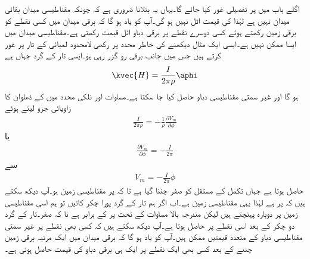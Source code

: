 اگلے باب میں  پر تفصیلی غور کیا جائے گا۔یہاں یہ بتلانا ضروری ہے کہ چونکہ مقناطیسی میدان  بقائی میدان نہیں ہے لہٰذا  کی قیمت اٹل نہیں ہو گی۔آپ کو یاد ہو گا کہ برقی میدان میں کسی نقطے کو برقی زمین رکھتے ہوئے کسی دوسرے نقطے پر برقی دباو اٹل قیمت رکھتی ہے۔مقناطیسی میدان میں ایسا ممکن نہیں ہے۔ایسی ایک مثال دیکھنے کی خاطر  محدد پر رکھی لامحدود لمبائی کے تار پر غور کرتے ہیں جس میں  جانب  برقی رو گزر رہی ہو۔ایسی تار کے گرد جہاں  ہے
\begin{align*}
\kvec{H}=\frac{I}{2\pi \rho} \aphi
\end{align*}
ہو گا اور غیر سمتی مقناطیسی دباو حاصل کیا جا سکتا ہے۔مساوات  اور نلکی محدد میں  کے ڈھلوان کا زاویائی جزو لیتے ہوئے
\begin{align*}
\frac{I}{2\pi \rho} =-\frac{1}{\rho} \frac{\partial V_m}{\partial \phi}
\end{align*}
یا
\begin{align*}
\frac{\partial V_m}{\partial \phi}=-\frac{I}{2\pi}
\end{align*}
سے
\begin{align*}
V_m=-\frac{I}{2\pi}\phi
\end{align*}
حاصل ہوتا ہے جہاں تکمل کے مستقل کو صفر چننا گیا ہے تا کہ  پر مقناطیسی زمین ہو۔آپ دیکھ سکتے ہیں کہ  پر  ہے لہٰذا یہی مقناطیسی زمین ہے۔اب اگر ہم تار کے گرد پورا چکر کاٹیں تو ہم اسی مقناطیسی زمین پر دوبارہ پہنچتے ہیں لیکن مندرجہ بالا مساوات کے تحت  پر  کے برابر ہے نا کہ صفر۔تار کے گرد دو چکر کے بعد اسی نقطے پر  حاصل ہوتا ہے۔آپ دیکھ سکتے ہیں کہ کسی بھی نقطے پر غیر سمتی مقناطیسی دباو کے متعدد قیمتیں ممکن ہیں۔آپ کو یاد ہو گا کہ برقی میدان میں ایک مرتبہ برقی زمین چننے کے بعد کسی بھی ایک نقطے پر ایک ہی برقی دباو کی قیمت حاصل ہوتی ہے۔

